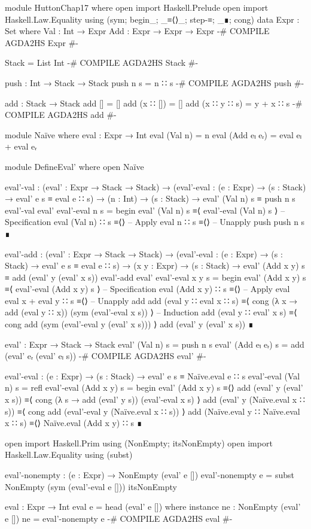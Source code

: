 \documentclass{article}
\begin{document}
\begin{code}
module HuttonChap17 where
open import Haskell.Prelude
open import Haskell.Law.Equality using (sym; begin_; _≡⟨⟩_; step-≡; _∎; cong)
data Expr : Set where
    Val : Int → Expr
    Add : Expr → Expr → Expr
{-# COMPILE AGDA2HS Expr #-}

Stack = List Int
{-# COMPILE AGDA2HS Stack #-}

push : Int → Stack → Stack
push n s = n ∷ s
{-# COMPILE AGDA2HS push #-}

add : Stack → Stack
add [] = []
add (x ∷ []) = []
add (x ∷ y ∷ s) = y + x ∷ s
{-# COMPILE AGDA2HS add #-}

module Naïve where
  eval : Expr → Int
  eval (Val n) = n
  eval (Add eₗ eᵣ) = eval eₗ + eval eᵣ

module DefineEval' where
  open Naïve

  eval'-val : (eval' : Expr → Stack → Stack)
    → (eval'-eval : (e : Expr) → (s : Stack) → eval' e s ≡ eval e ∷ s)
    → (n : Int) → (s : Stack) → eval' (Val n) s ≡ push n s
  eval'-val eval' eval'-eval n s =
    begin
      eval' (Val n) s
    ≡⟨ eval'-eval (Val n) s ⟩ -- Specification
      eval (Val n) ∷ s
    ≡⟨⟩ -- Apply eval
      n ∷ s
    ≡⟨⟩ -- Unapply push
      push n s
    ∎
\end{code}
\begin{code}
  eval'-add : (eval' : Expr → Stack → Stack)
    → (eval'-eval : (e : Expr) → (s : Stack) → eval' e s ≡ eval e ∷ s)
    → (x y : Expr) → (s : Stack)
    → eval' (Add x y) s ≡ add (eval' y (eval' x s))
  eval'-add eval' eval'-eval x y s =
    begin
      eval' (Add x y) s
    ≡⟨ eval'-eval (Add x y) s ⟩ -- Specification
      eval (Add x y) ∷ s
    ≡⟨⟩ -- Apply eval
      eval x + eval y ∷ s
    ≡⟨⟩ -- Unapply add
      add (eval y ∷ eval x ∷ s)
    ≡⟨ cong (λ x → add (eval y ∷ x)) (sym (eval'-eval x s)) ⟩ -- Induction
      add (eval y ∷ eval' x s)
    ≡⟨ cong add (sym (eval'-eval y (eval' x s))) ⟩
      add (eval' y (eval' x s))
    ∎
\end{code}
\begin{code}
eval' : Expr → Stack → Stack
eval' (Val n) s = push n s
eval' (Add eₗ eᵣ) s = add (eval' eᵣ (eval' eₗ s))
{-# COMPILE AGDA2HS eval' #-}

eval'-eval : (e : Expr) → (s : Stack) → eval' e s ≡ Naïve.eval e ∷ s
eval'-eval (Val n) s = refl
eval'-eval (Add x y) s =
  begin
    eval' (Add x y) s
  ≡⟨⟩
    add (eval' y (eval' x s))
  ≡⟨ cong (λ s → add (eval' y s)) (eval'-eval x s) ⟩
    add (eval' y (Naïve.eval x ∷ s))
  ≡⟨ cong add (eval'-eval y (Naïve.eval x ∷ s)) ⟩
    add (Naïve.eval y ∷ Naïve.eval x ∷ s)
  ≡⟨⟩
    Naïve.eval (Add x y) ∷ s
  ∎

open import Haskell.Prim using (NonEmpty; itsNonEmpty)
open import Haskell.Law.Equality using (subst)

eval'-nonempty : (e : Expr) → NonEmpty (eval' e [])
eval'-nonempty e = subst NonEmpty (sym (eval'-eval e [])) itsNonEmpty

eval : Expr → Int
eval e = head (eval' e [])
  where instance
    ne : NonEmpty (eval' e [])
    ne = eval'-nonempty e
{-# COMPILE AGDA2HS eval #-}
\end{code} 
\end{document}
